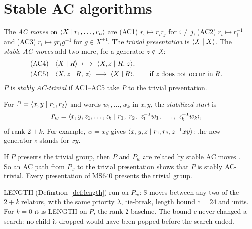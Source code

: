 \section{Stable AC algorithms}\label{sec:stable}

\begin{definition}\label{def:stableac}
The \emph{AC moves} on $\langle X \mid r_1,\dots,r_n \rangle$ are (AC1) $r_i\mapsto r_ir_j$ for $i\neq j$, (AC2) $r_i\mapsto
r_i^{-1}$ and (AC3) $r_i\mapsto gr_ig^{-1}$ for $g\in X^{\pm1}$. The \emph{trivial presentation} is $\langle X \mid X \rangle$.
The \emph{stable AC moves} add two more, for a generator $z\notin X$:
\begin{align*}
&(\mathrm{AC4})\quad \pres{X}{R}\ \longmapsto\ \pres{X,z}{R,\,z},\\
&(\mathrm{AC5})\quad \pres{X,z}{R,\,z}\ \longmapsto\ \pres{X}{R},\qquad\text{if $z$ does not occur in $R$}.
\end{align*}
$P$ is \emph{stably AC-trivial} if AC1--AC5 take $P$ to the trivial presentation.
\end{definition}

\begin{definition}\label{def:stab}
For $P=\langle x,y \mid r_1,r_2 \rangle$ and words $w_1,\dots,w_k$ in $x,y$, the \emph{stabilized start} is
\[
P_w=\pres{x,y,z_1,\dots,z_k}{r_1,\ r_2,\ z_1^{-1}w_1,\ \dots,\ z_k^{-1}w_k},
\]
of rank $2+k$. For example, $w=xy$ gives $\langle x,y,z \mid r_1,r_2,z^{-1}xy \rangle$: the new generator $z$ stands for $xy$.
\end{definition}

If $P$ presents the trivial group, then $P$ and $P_w$ are related by stable AC moves \cite[Lemma~11]{SMM24}. So an
AC path from $P_w$ to the trivial presentation shows that $P$ is stably AC-trivial. Every presentation of MS640
presents the trivial group.

\begin{definition}\label{def:naive}
LENGTH (Definition~\ref{def:length}) run on $P_w$: S-moves between any two of the $2+k$ relators, with the same
priority $\lambda$, tie-break, length bound $c=24$ and units. For $k=0$ it is LENGTH on $P$, the rank-$2$ baseline.
The bound $c$ never changed a search: no child it dropped would have been popped before the search ended.
\end{definition}

